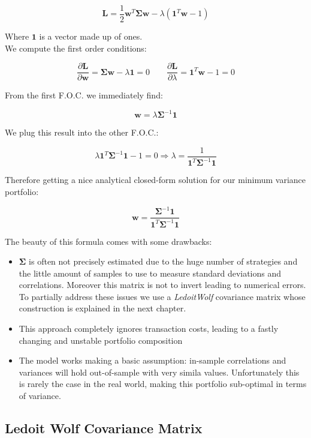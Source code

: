 \documentclass[12pt]{article} %
\numberwithin{equation}{subsection}
\begin{document}
$$
\mathbf{L} = \frac{1}{2} \mathbf{w}^T\mathbf{\Sigma} \mathbf{w} - \lambda\left(\mathbf{1}^T\mathbf{w} - 1\right)
$$

Where $\mathbf{1}$ is a vector made up of ones.\\
We compute the first order conditions:

$$
\frac{\partial \mathbf{L}}{\partial \mathbf{w}} = \mathbf{\Sigma} \mathbf{w} - \lambda\mathbf{1} = 0 \qquad  \frac{\partial \mathbf{L}}{\partial \lambda} = \mathbf{1}^T\mathbf{w} - 1 = 0
$$

From the first F.O.C. we immediately find:

$$
\mathbf{w} = \lambda \mathbf{\Sigma}^{-1} \mathbf{1}
$$

We plug this result into the other F.O.C.:

$$
\lambda \mathbf{1}^T \mathbf{\Sigma}^{-1} \mathbf{1} - 1 = 0 \Longrightarrow \lambda = \frac{1}{\mathbf{1}^T \mathbf{\Sigma}^{-1} \mathbf{1}}
$$

Therefore getting a nice analytical closed-form solution for our minimum variance portfolio:

$$
\mathbf{w} = \frac{\mathbf{\Sigma}^{-1} \mathbf{1}}{\mathbf{1}^T \mathbf{\Sigma}^{-1} \mathbf{1}}
$$

The beauty of this formula comes with some drawbacks:
\begin{itemize}
	\item $\mathbf{\Sigma}$ is often not precisely estimated due to the huge number of strategies and the little amount of samples to use to measure standard deviations and correlations. Moreover this matrix is not to invert leading to numerical errors. To partially address these issues we use a \textit{LedoitWolf} covariance matrix whose construction is explained in the next chapter.
	\item This approach completely ignores transaction costs, leading to a fastly changing and unstable portfolio composition
	\item The model works making a basic assumption: in-sample correlations and variances will hold out-of-sample with very simila values. Unfortunately this is rarely the case in the real world, making this portfolio sub-optimal in terms of variance.
\end{itemize}

\subsection*{Ledoit Wolf Covariance Matrix}
\end{document}
